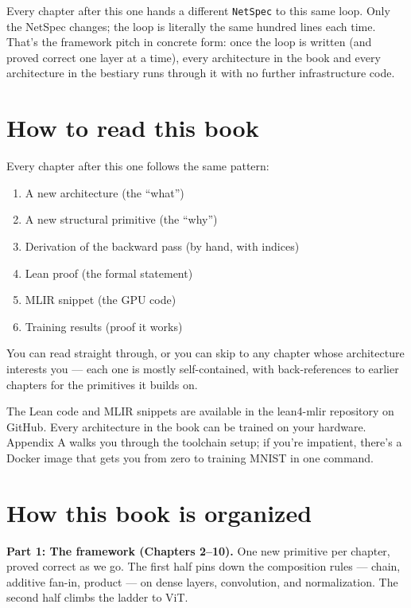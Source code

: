 Every chapter after this one hands a different \texttt{NetSpec} to
this same loop. Only the NetSpec changes; the loop is literally
the same hundred lines each time. That's the framework pitch in
concrete form: once the loop is written (and proved correct one
layer at a time), every architecture in the book and every
architecture in the bestiary runs through it with no further
infrastructure code.

\section*{How to read this book}

Every chapter after this one follows the same pattern:

\begin{enumerate}
  \item A new architecture (the ``what'')
  \item A new structural primitive (the ``why'')
  \item Derivation of the backward pass (by hand, with indices)
  \item Lean proof (the formal statement)
  \item MLIR snippet (the GPU code)
  \item Training results (proof it works)
\end{enumerate}

You can read straight through, or you can skip to any chapter whose
architecture interests you --- each one is mostly self-contained, with
back-references to earlier chapters for the primitives it builds on.

The Lean code and MLIR snippets are available in the lean4-mlir
repository on GitHub. Every architecture in the book can be trained
on your hardware. Appendix A walks you through the toolchain setup;
if you're impatient, there's a Docker image that gets you from zero
to training MNIST in one command.

\section*{How this book is organized}

\textbf{Part 1: The framework (Chapters 2--10).} One new primitive per
chapter, proved correct as we go. The first half pins down the
composition rules --- chain, additive fan-in, product --- on dense
layers, convolution, and normalization. The second half climbs the
ladder to ViT.

